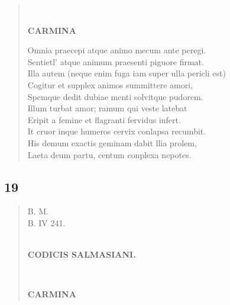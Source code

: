 \documentclass[11pt, a4paper]{report}
\begin{document}
\begin{verse}
        ﻿\pagebreak 
    \begin{center} \textbf{CARMINA} \end{center} \marginpar{[2]} Omnia praecepi atque animo mecum ante peregi. \\ Sentietl’ atque animum praesenti piguore firmat. \\ Illa autem (neque enim fuga iam super ulla pericli est) \\ Cogitur et supplex animos summittere amori, \\ Spemque dedit dubiae menti solvitque pudorem. \\ Illum turbat amor; ramum qui veste latebat \\ Eripit a femine et flagranti fervidus infert. \\ It cruor inque humeros cervix conlapsa recumbit. \\ His demum exactis geminam dabit llia prolem, \\ Laeta deum partu, centum conplexa nepotes. \\ 
      \end{verse}
  
            \subsection*{19}
      \begin{verse}
      B. M. \\ B. IV 241. \\ 
        ﻿\pagebreak 
    \begin{center} \textbf{CODICIS SALMASIANI.} \end{center} \marginpar{[83]} 
        ﻿\pagebreak 
    \begin{center} \textbf{CARMINA} \end{center} \marginpar{[84]} 
      \end{verse}
  
\end{document}
